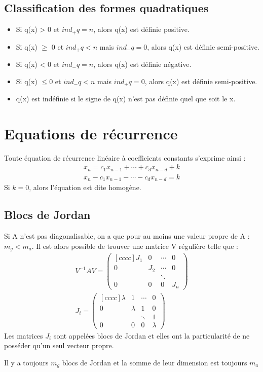 \documentclass[a4paper]{book}
\begin{document}
\section{Classification des formes quadratiques}
\begin{itemize}
    \item Si q(x) > 0 et $ind_+ q = n$, alors q(x) est définie positive.
    \item Si q(x) $\geq$ 0 et $ind_+ q < n$ mais $ind_-q = 0$, alors q(x) est définie semi-positive.
    \item Si q(x) < 0 et $ind_- q = n$, alors q(x) est définie négative.
    \item Si q(x) $\leq 0$ et $ind_- q < n$ mais $ind_+q = 0$, alors q(x) est définie semi-positive.
    \item q(x) est indéfinie si le signe de q(x) n'est pas définie quel que soit le x.
\end{itemize}
\chapter{Equations de récurrence}
Toute équation de récurrence linéaire à coefficients constants s'exprime ainsi :
\begin{gather}
    x_n = c_1x_{n-1} + \cdots + c_dx_{n-d} + k \\
    x_n - c_1x_{n-1} - \cdots - c_dx_{n-d} = k
\end{gather}
Si $k=0$, alors l'équation est dite homogène.
\section{Blocs de Jordan}
Si A n'est pas diagonalisable, on a que pour au moins une valeur propre de A : $m_g < m_a$. Il est alors possible de trouver une matrice V régulière telle que :
\begin{gather}
    V^{-1}AV = \begin{pmatrix}[cccc]
    J_1 & 0 & \cdots& 0 \\
    0 & J_2 & \cdots & 0 \\
    &&\ddots&\\
    0&0&0&J_n
    \end{pmatrix} \\
    J_i = \begin{pmatrix}[cccc]
    \lambda & 1 & \cdots & 0 \\
    0& \lambda & 1&0 \\
    &&\ddots&1 \\
    0&0&0&\lambda
    \end{pmatrix}
\end{gather}
Les matrices $J_i$ sont appelées blocs de Jordan et elles ont la particularité de ne posséder qu'un seul vecteur propre.
\begin{framed}
    Il y a toujours $m_g$ blocs de Jordan et la somme de leur dimension est toujours $m_a$
\end{framed}
\end{document}
